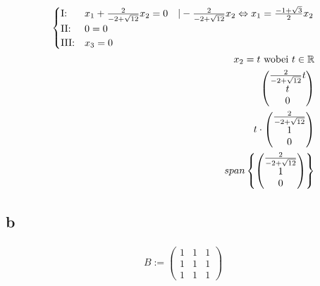 \begin{longtable}{p{10cm}}
\end{longtable}

\begin{align*}
    \begin{cases}
        \text{I:\@}   & x_1 + \frac{2}{-2 + \sqrt{12}}x_2 = 0 \quad |- \frac{2}{-2 + \sqrt{12}}x_2 \Leftrightarrow x_1 =  \frac{-1+\sqrt{3}}{2}x_2 \\
        \text{II:\@}  & 0 = 0                                                                                                                      \\
        \text{III:\@} & x_3 = 0
    \end{cases} \\
    x_2 = t \text{ wobei } t \in \mathbb{R}                                                                                                                                            \\
    \begin{pmatrix}
        \frac{2}{-2 + \sqrt{12}}t \\
        t                         \\
        0
    \end{pmatrix}                                                                                                                                             \\
    t \cdot \begin{pmatrix}
                \frac{2}{-2 + \sqrt{12}} \\
                1                        \\
                0
            \end{pmatrix}                                                                                                                                      \\
    span \left\{\begin{pmatrix}
                    \frac{2}{-2 + \sqrt{12}} \\
                    1                        \\
                    0
                \end{pmatrix}\right\}
\end{align*}

\subsection{b}

\begin{align*}
    B := \begin{pmatrix}
             1 & 1 & 1 \\
             1 & 1 & 1 \\
             1 & 1 & 1
         \end{pmatrix}
\end{align*}


